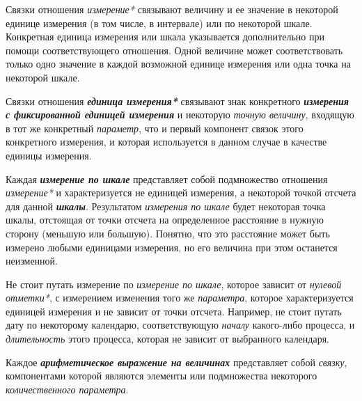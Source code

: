 Связки отношения \textit{измерение*} связывают величину и ее значение в некоторой единице измерения (в том числе, в интервале) или по некоторой шкале. Конкретная единица измерения или шкала указывается дополнительно при помощи соответствующего отношения. Одной величине может соответствовать только одно значение в каждой возможной единице измерения или одна точка на некоторой шкале.
	
	
\begin{SCn}
\end{SCn}

Связки отношения \textbf{\textit{единица измерения*}} связывают знак конкретного \textbf{\textit{измерения с фиксированной единицей измерения}} и некоторую \textit{точную величину}, входящую в тот же конкретный \textit{параметр}, что и первый компонент связок этого конкретного измерения, и которая используется в данном случае в качестве единицы измерения.
	
\begin{SCn}
\end{SCn}

Каждая \textbf{\textit{измерение по шкале}} представляет собой подмножество отношения \textit{измерение*} и характеризуется не единицей измерения, а некоторой точкой отсчета для данной \textbf{\textit{шкалы}}. Результатом \textit{измерения по шкале} будет некоторая точка шкалы, отстоящая от точки отсчета на определенное расстояние в нужную сторону (меньшую или большую). Понятно, что это расстояние может быть измерено любыми единицами измерения, но его величина при этом останется неизменной.
		
Не стоит путать измерение по \textit{измерение по шкале}, которое зависит от \textit{нулевой отметки*}, с измерением изменения того же \textit{параметра}, которое характеризуется единицей измерения и не зависит от точки отсчета. Например, не стоит путать дату по некоторому календарю, соответствующую \textit{началу} какого-либо процесса, и \textit{длительность} этого процесса, которая не зависит от выбранного календаря.

Каждое \textbf{\textit{арифметическое выражение на величинах}} представляет собой \textit{связку}, компонентами которой являются элементы или подмножества некоторого \textit{количественного параметра}.

